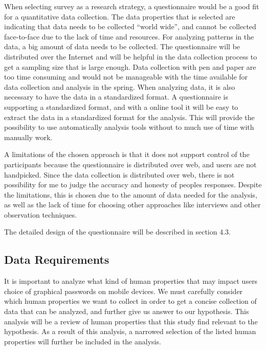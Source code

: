     When selecting survey as a research strategy, a questionnaire would be a good fit for a quantitative data collection. The data properties that is selected are indicating that data needs to be collected ``world wide'', and cannot be collected face-to-face due to the lack of time and resources. For analyzing patterns in the data, a big amount of data needs to be collected. The questionnaire will be distributed over the Internet and will be helpful in the data collection process to get a sampling size that is large enough. Data collection with pen and paper are too time consuming and would not be manageable with the time available for data collection and analysis in the spring. When analyzing data, it is also necessary to have the data in a standardized format. A questionnaire is supporting a standardized format, and with a online tool it will be easy to extract the data in a standardized format for the analysis. This will provide the possibility to use automatically analysis tools without to much use of time with manually work.

    A limitations of the chosen approach is that it does not support control of the participants because the questionnaire is distributed over web, and users are not handpicked. Since the data collection is distributed over web, there is not possibility for me to judge the accuracy and honesty of peoples responses. Despite the limitations, this is chosen due to the amount of data needed for the analysis, as well as the lack of time for choosing other approaches like interviews and other observation techniques. 

    The detailed design of the questionnaire will be described in section 4.3.

  \subsection{Data Requirements}
  
  It is important to analyze what kind of human properties that may impact users choice of graphical passwords on mobile devices. We must carefully consider which human properties we want to collect in order to get a concise collection of data that can be analyzed, and further give us answer to our hypothesis. This analysis will be a review of human properties that this study find relevant to the hypothesis. As a result of this analysis, a narrowed selection of the listed human properties will further be included in the analysis.  

